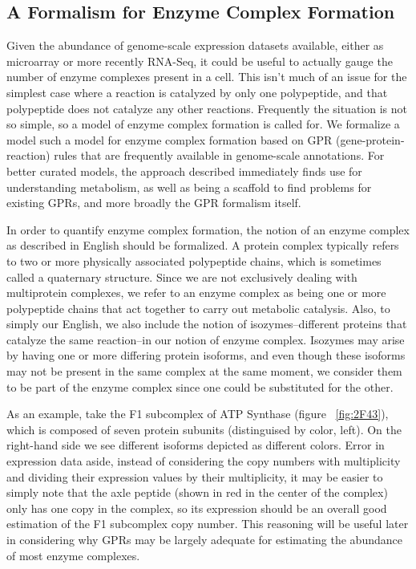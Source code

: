 \documentclass[phd,tocprelim]{cornell}
\begin{document}
\subsection{A Formalism for Enzyme Complex Formation}

Given the abundance of genome-scale expression datasets available, either as microarray or more
recently RNA-Seq, it could be useful to actually gauge the number of enzyme complexes present 
in a cell. This isn't much of an issue for the simplest case where a reaction is
catalyzed by only one polypeptide, and that polypeptide does not catalyze any other reactions.
Frequently the situation is not so simple, so a model of enzyme complex formation is called for.
We formalize a model such a model for enzyme complex formation based 
on GPR (gene-protein-reaction) rules that are frequently available
in genome-scale annotations. For better curated models, the approach described immediately finds
use for understanding metabolism, as well as being a scaffold to find problems for
existing GPRs, and more broadly the GPR formalism itself.

In order to  quantify enzyme complex formation, the notion of an enzyme complex as described in English 
should be formalized.
A protein complex typically refers to two or more physically associated polypeptide chains, which is
sometimes called a quaternary structure. Since we
are not exclusively dealing with multiprotein complexes, we refer to an enzyme complex as being
one or more polypeptide chains that act together to carry out metabolic catalysis. Also, to simply
our English, we also include the notion of isozymes--different proteins that catalyze the 
same reaction--in our notion of enzyme complex. Isozymes may arise by having one or more differing
protein isoforms, and even though these isoforms may not be present in the same complex at the same
moment, we consider them to be part of the enzyme complex since one could be substituted for the other.

As an example, take the F1 subcomplex of ATP Synthase (figure
~\ref{fig:2F43}), which is composed of seven protein subunits
(distinguised by color, left). On the right-hand side we see different
isoforms depicted as different colors.  Error in expression data
aside, instead of considering the copy numbers with multiplicity and
dividing their expression values by their multiplicity, it may be
easier to simply note that the axle peptide (shown in red in the
center of the complex) only has one copy in the complex, so its
expression should be an overall good estimation of the F1 subcomplex
copy number. This reasoning will be useful later in considering why
GPRs may be largely adequate for estimating the abundance of most
enzyme complexes.
\end{document}
